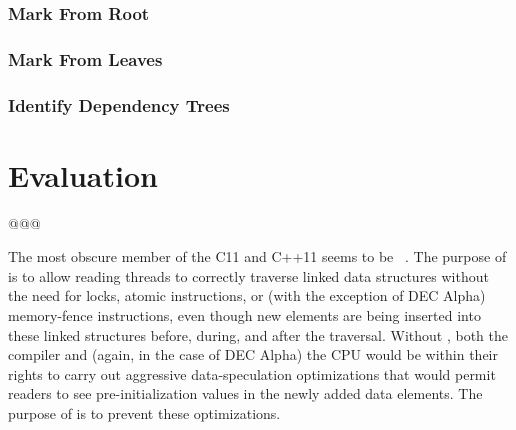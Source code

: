 \documentclass[letterpaper,twocolumn,10pt]{article}
\begin{document}
\subsubsection{Mark From Root}
\label{sec:Mark From Root}

\subsubsection{Mark From Leaves}
\label{sec:Mark From Leaves}

\subsubsection{Identify Dependency Trees}
\label{sec:Identify Dependency Trees}

\section{Evaluation}
\label{sec:Evaluation}

@@@

The most obscure member of the C11 and C++11  
seems to be
~\cite{RichardSmith2015N4527}.
The purpose of  is to allow reading threads
to correctly traverse linked data structures without the need for locks,
atomic instructions, or (with the exception of DEC Alpha) memory-fence
instructions, even though new elements are being inserted into these
linked structures before, during, and after the traversal.
Without , both the compiler and (again, in the case
of DEC Alpha) the CPU would be within their rights to carry out aggressive
data-speculation optimizations that would permit readers to see
pre-initialization values in the newly added data elements.
The purpose of  is to prevent these optimizations.
\end{document}
